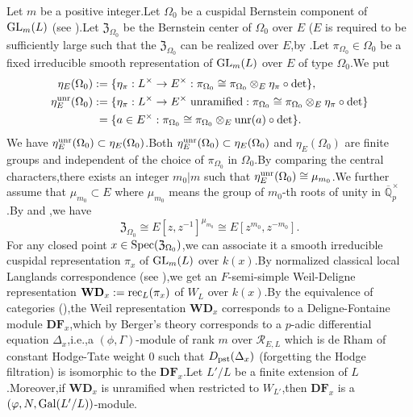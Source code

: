 \documentclass[SecEq,CM,GP]{degruyter-crelle} %
\theoremstyle{plain}
\newcommand{\df}{{\mathbf{DF}}}
\newcommand{\EX}{{E^\times}}
\newcommand{\gal}{{\rm Gal}}
\newcommand{\GLN}{{\rm GL}}
\newcommand{\LX}{{L^\times}}
\newcommand{\obp}{\overline{\mathbb{Q}}_p^\times}
\newcommand{\pst}{{\rm pst}}
\newcommand{\rec}{{\rm rec}_L}
\newcommand{\Spec}{\rm Spec}
\newcommand{\unra}{{\rm unr}}
\newcommand{\wdre}{{\textbf{WD}}}
\newcommand{\cR}{\mathcal R}
\newcommand{\FZ}{{\mathfrak{Z}}}
\begin{document}
Let $m$ be a positive integer.\;Let $\Omega_0$ be a cuspidal Bernstein component of $\GLN_{m}(L)$ (see \cite{bernstein1984centre}).\;Let $\mathfrak{Z}_{\Omega_0}$ be the Bernstein center of $\Omega_0$ over $E$ ($E$ is required to be sufficiently large such that the $\mathfrak{Z}_{\Omega_0}$ can be realized over $E$,\;by \cite[Section 3.13]{PATCHING2016}.\;Let 
$\pi_{\Omega_0}\in \Omega_0$ be a fixed irreducible smooth representation of $\GLN_{m}(L)$ over $E$ of type $\Omega_0$.\;We put
\begin{equation*}
\begin{aligned}
	\eta_{E}(\Omega_0)&:=\{\eta_{\pi}:\LX\rightarrow \EX :\pi_{\Omega_0}\cong \pi_{\Omega_0}\otimes_{E}\eta_{\pi}\circ\det\},\\
	\eta_{E}^{\unra}(\Omega_0)&:=\{\eta_{\pi}:\LX\rightarrow \EX \text{\;unramified}:\pi_{\Omega_0}\cong \pi_{\Omega_0}\otimes_{E}\eta_{\pi}\circ\det\}\\
	&\;=\{a\in\EX:\pi_{\Omega_0}\cong \pi_{\Omega_0}\otimes_{E}\unra(a)\circ\det\}.
\end{aligned}
\end{equation*}
We have $\eta_{E}^{\unra}(\Omega_0)\subset \eta_{E}(\Omega_0)$.\;Both $\eta_{E}^{\unra}(\Omega_0)\subset \eta_{E}(\Omega_0)$ and $\eta_{E}(\Omega_0)$ are finite groups and independent of the choice of $\pi_{\Omega_0}$ in $\Omega_0$.\;By comparing the central characters,\;there exists an integer $m_0|m$ such that $ \eta_{E}^{\unra}(\Omega_0)\cong \mu_{m_0}$.\;We further assume that $\mu_{m_0}\subset E$ where $\mu_{m_0}$ means the group of $m_0$-th roots of unity in $\obp$.\;By \cite[Pages-243,\;Lemma]{PATCHING2016} and \cite[Section 2.2]{Ding2021},\;we have 
\[\mathfrak{Z}_{\Omega_0}\cong E[z,z^{-1}]^{\mu_{m_0}}\cong E[z^{m_0},z^{-m_0}].\]
For any closed point $x\in \Spec(\FZ_{\Omega_0})$,\;we can associate it a smooth irreducible cuspidal representation $\pi_{x}$ of $\GLN_{m}(L)$ over $k(x)$.\;By normalized classical local Langlands correspondence (see \cite{scholze2013local}),\;we get an $F$-semi-simple Weil-Deligne representation $\wdre_{x}:=\rec(\pi_{x})$ of $W_L$ over $k(x)$.\;By the equivalence of categories (\cite[Proposition 4.1]{breuil2007first}),\;the Weil representation $\wdre_{x}$ corresponds to a Deligne-Fontaine module $\df_x$,\;which by Berger's theory \cite{berger2008equations} corresponds  to a $p$-adic differential equation ${\Delta_x}$,\;i.e.,\;a $(\phi,\Gamma)$-module of rank $m$ over $\cR_{E,L}$ which is de Rham of constant Hodge-Tate weight $0$ such that $D_{\pst}(\Delta_x)$ (forgetting the Hodge filtration) is isomorphic to the $\df_x$.\;Let $L'/L$ be a finite extension of $L$.\;Moreover,\;if $\wdre_{x}$ is unramified when restricted to $W_{L'}$,\;then $\df_x$ is a $(\varphi,N,\gal(L'/L))$-module.\;
\end{document}
